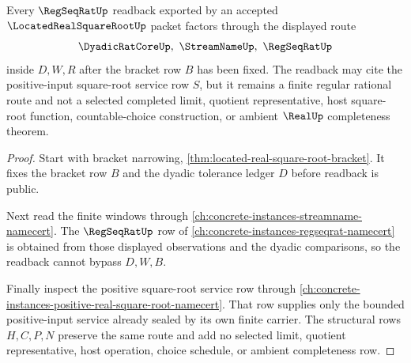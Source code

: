 \begin{theorem}
\label{thm:located-real-square-root-readback}
Every $\RegSeqRatUp$ readback exported by an accepted $\LocatedRealSquareRootUp$ packet factors through the displayed route
$$
\DyadicRatCoreUp,\ \StreamNameUp,\ \RegSeqRatUp
$$
inside $D,W,R$ after the bracket row $B$ has been fixed. The readback may cite the positive-input square-root service row $S$, but it remains a finite regular rational route and not a selected completed limit, quotient representative, host square-root function, countable-choice construction, or ambient $\RealUp$ completeness theorem.
\end{theorem}
\begin{proof}
Start with bracket narrowing, \autoref{thm:located-real-square-root-bracket}. It fixes the bracket row $B$ and the dyadic tolerance ledger $D$ before readback is public.

Next read the finite windows through \autoref{ch:concrete-instances-streamname-namecert}. The $\RegSeqRatUp$ row of \autoref{ch:concrete-instances-regseqrat-namecert} is obtained from those displayed observations and the dyadic comparisons, so the readback cannot bypass $D,W,B$.

Finally inspect the positive square-root service row through \autoref{ch:concrete-instances-positive-real-square-root-namecert}. That row supplies only the bounded positive-input service already sealed by its own finite carrier. The structural rows $H,C,P,N$ preserve the same route and add no selected limit, quotient representative, host operation, choice schedule, or ambient completeness row.
\end{proof}

